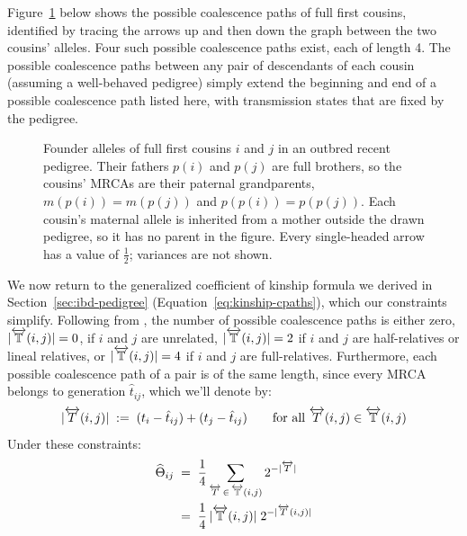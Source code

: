 \documentclass[12pt]{article}
\numberwithin{equation}{section}
\begin{document}
Figure~\ref{fig:ibd-cousins} below shows the possible coalescence paths of full first cousins, identified by tracing the arrows up and then down the graph between the two cousins' alleles.
Four such possible coalescence paths exist, each of length 4.
The possible coalescence paths between any pair of descendants of each cousin (assuming a well-behaved pedigree) simply extend the beginning and end of a possible coalescence path listed here, with transmission states that are fixed by the pedigree.

\begin{figure}[H]
    \begin{floatcard}
        
        \caption{%
            Founder alleles of full first cousins $i$ and $j$ in an outbred recent pedigree.
            Their fathers $p(i)$ and $p(j)$ are full brothers, so the cousins' MRCAs are their paternal grandparents, $m(p(i)) = m(p(j))$ and $p(p(i)) = p(p(j))$.
            Each cousin's maternal allele is inherited from a mother outside the drawn pedigree, so it has no parent in the figure.
            Every single-headed arrow has a value of $\tfrac12$; variances are not shown.
        }
        \label{fig:ibd-cousins}
    \end{floatcard}
\end{figure}


We now return to the generalized coefficient of kinship formula we derived in Section~\ref{sec:ibd-pedigree} (Equation~\eqref{eq:kinship-cpaths}), which our constraints simplify.
Following from , the number of possible coalescence paths is either zero, $|\overleftrightarrow{\mathbb{T}}(i,j)| = 0$, if $i$ and $j$ are unrelated, $|\overleftrightarrow{\mathbb{T}}(i,j)| = 2$ if $i$ and $j$ are half-relatives or lineal relatives, or $|\overleftrightarrow{\mathbb{T}}(i,j)| = 4$ if $i$ and $j$ are full-relatives.
Furthermore, each possible coalescence path of a pair is of the same length, since every MRCA belongs to generation $\hat{t}_{ij}$, which we'll denote by:
\begin{equation}\label{eq:cpath-length}
    |\overleftrightarrow{T}(i,j)| \;:=\; (t_i - \hat{t}_{ij}) + (t_j - \hat{t}_{ij})
    \qquad \text{for all } \overleftrightarrow{T}(i,j) \in \overleftrightarrow{\mathbb{T}}(i,j)
\end{equation}
Under these constraints:
\begin{equation}\label{eq:kinship-well-behaved}
\begin{aligned}
    \widehat\Theta_{ij} \;&=\; \frac14 \sum_{\overleftrightarrow{T} \,\in\, \overleftrightarrow{\mathbb{T}}(i,j)} 2^{-|\overleftrightarrow{T}|} \\
    \;&=\; \frac14 \, |\overleftrightarrow{\mathbb{T}}(i,j)| \; 2^{- |\overleftrightarrow{T}(i,j)|}
\end{aligned}
\end{equation}
\end{document}

